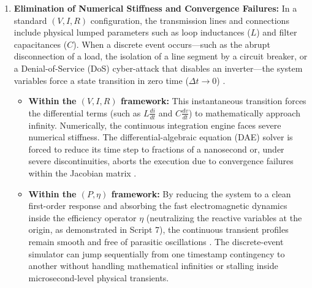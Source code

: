 \documentclass[11pt, a4paper]{article}
\begin{document}
\begin{enumerate}
    \item \textbf{Elimination of Numerical Stiffness and Convergence Failures:}
    In a standard $(V, I, R)$ configuration, the transmission lines and connections include physical lumped parameters such as loop inductances ($L$) and filter capacitances ($C$). When a discrete event occurs---such as the abrupt disconnection of a load, the isolation of a line segment by a circuit breaker, or a Denial-of-Service (DoS) cyber-attack that disables an inverter---the system variables force a state transition in zero time ($\Delta t \to 0$) \cite{moutevelis2024taxonomy, pr13092969}.
    \begin{itemize}
        \item \textbf{Within the $(V, I, R)$ framework:} This instantaneous transition forces the differential terms (such as $L \frac{di}{dt}$ and $C \frac{dv}{dt}$) to mathematically approach infinity. Numerically, the continuous integration engine faces severe numerical stiffness. The differential-algebraic equation (DAE) solver is forced to reduce its time step to fractions of a nanosecond or, under severe discontinuities, aborts the execution due to convergence failures within the Jacobian matrix \cite{en19020304, moutevelis2024taxonomy}.
        \item \textbf{Within the $(P, \eta)$ framework:} By reducing the system to a clean first-order response and absorbing the fast electromagnetic dynamics inside the efficiency operator $\eta$ (neutralizing the reactive variables at the origin, as demonstrated in Script 7), the continuous transient profiles remain smooth and free of parasitic oscillations \cite{en17143468, biom11020343}. The discrete-event simulator can jump sequentially from one timestamp contingency to another without handling mathematical infinities or stalling inside microsecond-level physical transients.
    \end{itemize}


\end{enumerate}
\end{document}
